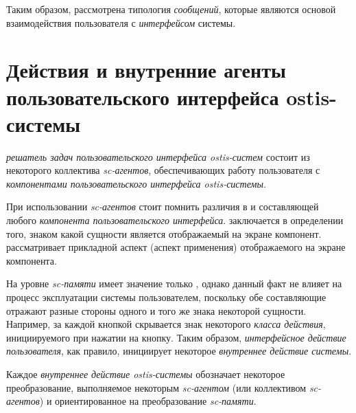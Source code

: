 Таким образом, рассмотрена типология \textit{сообщений}, которые являются основой взаимодействия пользователя с \textit{интерфейсом} системы.

\section{Действия и внутренние агенты пользовательского интерфейса ostis-системы}
\label{sec_interfaces_actions_and_agents}

\textit{решатель задач пользовательского интерфейса ostis-систем} состоит из некоторого коллектива \textit{sc-агентов}, обеспечивающих работу пользователя с \textit{компонентами пользовательского интерфейса ostis-системы}.

При использовании \textit{sc-агентов} стоит помнить различия в  и  составляющей любого \textit{компонента пользовательского интерфейса}.   заключается в определении того, знаком какой сущности является отображаемый на экране компонент.  рассматривает прикладной аспект (аспект применения) отображаемого на экране компонента.

На уровне \textit{sc-памяти} имеет значение только , однако данный факт не влияет на процесс эксплуатации системы пользователем, поскольку обе составляющие отражают разные стороны одного и того же знака некоторой сущности. Например, за каждой кнопкой скрывается знак некоторого \textit{класса действия}, инициируемого при нажатии на кнопку. Таким образом, \textit{интерфейсное действие пользователя}, как правило, инициирует некоторое \textit{внутреннее действие системы}. 

\begin{SCn}



\end{SCn}
	
Каждое \textit{внутреннее действие ostis-системы} обозначает некоторое преобразование, выполняемое некоторым \textit{sc-агентом} (или коллективом \textit{sc-агентов}) и ориентированное на преобразование \textit{sc-памяти}.

\begin{SCn}


\end{SCn}

